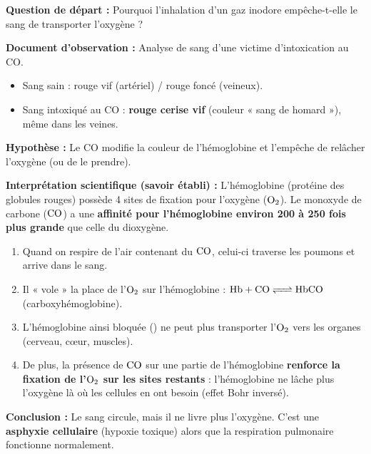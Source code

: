 \documentclass[11pt]{article}
\begin{document}
\begin{experience}
\textbf{Question de départ :} Pourquoi l'inhalation d'un gaz inodore empêche-t-elle le sang de transporter l'oxygène ?

\textbf{Document d'observation :} Analyse de sang d'une victime d'intoxication au CO.
\begin{itemize}
    \item Sang sain : rouge vif (artériel) / rouge foncé (veineux).
    \item Sang intoxiqué au CO : \textbf{rouge cerise vif} (couleur « sang de homard »), même dans les veines.
\end{itemize}

\textbf{Hypothèse :} Le CO modifie la couleur de l'hémoglobine et l'empêche de relâcher l'oxygène (ou de le prendre).

\textbf{Interprétation scientifique (savoir établi) :}
L'hémoglobine (protéine des globules rouges) possède 4 sites de fixation pour l'oxygène ($\ce{O2}$). Le monoxyde de carbone ($\ce{CO}$) a une \textbf{affinité pour l'hémoglobine environ 200 à 250 fois plus grande} que celle du dioxygène.
\begin{enumerate}
    \item Quand on respire de l'air contenant du $\ce{CO}$, celui-ci traverse les poumons et arrive dans le sang.
    \item Il « vole » la place de l'$\ce{O2}$ sur l'hémoglobine : $\ce{Hb + CO <=> HbCO}$ (carboxyhémoglobine).
    \item L'hémoglobine ainsi bloquée () ne peut plus transporter l'$\ce{O2}$ vers les organes (cerveau, cœur, muscles).
    \item De plus, la présence de $\ce{CO}$ sur une partie de l'hémoglobine \textbf{renforce la fixation de l'$\ce{O2}$ sur les sites restants} : l'hémoglobine ne lâche plus l'oxygène là où les cellules en ont besoin (effet Bohr inversé).
\end{enumerate}

\textbf{Conclusion :} Le sang circule, mais il ne livre plus l'oxygène. C'est une \textbf{asphyxie cellulaire} (hypoxie toxique) alors que la respiration pulmonaire fonctionne normalement.
\end{experience}
\end{document}
